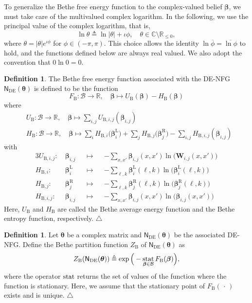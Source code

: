 \documentclass[conference]{IEEEtran}
\theoremstyle{plain}
\theoremstyle{definition}
\newtheorem{definition}[thm]{Definition}
\newcommand{\edefn}{\hfill$\triangle$}
\providecommand{\R}{\mathbb {R}}
\providecommand{\C}{\mathbb {C}}
\newcommand{\B}{\mathrm{B}}
\newcommand{\stat}{\operatornamewithlimits{stat}}
\newcommand{\sfn}{\mathsf{N}}
\newcommand{\bbeta}{\boldsymbol{\beta}}
\newcommand{\br}[1]{\bbeta^{\mathrm{R}}_{#1}}
\newcommand{\bl}[1]{\bbeta^{\mathrm{L}}_{#1}}
\newcommand{\be}[1]{\bbeta_{#1}}
\newcommand{\btheta}{\boldsymbol{\theta}}
\newcommand{\defeq}{\triangleq}
\newcommand{\sfnDE}{\sfn_{\mathrm{DE}}}
\begin{document}
 To generalize the Bethe free energy function to the complex-valued belief
 $\bbeta$, we must take care of the multivalued complex logarithm. In the
 following, we use the principal value of the complex logarithm, that is,
 \[
  \ln \theta \defeq\ln|\theta|+\iota\phi,\quad \theta\in\C\setminus\R_{\leq 0},
 \]
 where $\theta=|\theta|e^{\iota \phi}$ for $\phi\in(-\pi,\pi)$. This choice
 allows the identity $\ln\overline\phi=\overline{\ln\phi}$ to hold, and the
 functions defined below are always real valued. We also adopt the convention
 that $0\ln 0=0$.

 \begin{definition}
  The Bethe free energy function associated with the DE-NFG $\sfnDE(\btheta)$ is defined to be the function
  \[
   F_{\B}:\mathcal B\to\R,\quad \bbeta\mapsto  U_{\B}(\bbeta) - H_{\mathrm{B}}(\bbeta)
  \]
  where
  \begin{align*}
    & U_{\B} : \mathcal B\to \R,\quad \bbeta \mapsto \sum_{i,j} U_{\B,i,j}(\be{i,j})                                 \\
    & H_{\B}: \mathcal B \to \R,\quad \bbeta \mapsto \sum_iH_{\B,i}\big(\bl{i}\big)+\sum_{j}H_{\B,j}\big(\br{j}\big)
   -\sum_{i,j}H_{\B,i,j}(\be{i,j})
  \end{align*}
  with
  \begin{alignat*}{3}
   U_{\B,i,j}:\  & \be{i,j} &  & \mapsto &  & -\sum_{x,x'} \be{i,j}(x,x')\ln\big(\mathbf W_{i,j}(x,x')\big) \\
   H_{\B,i}:\    & \bl{i}   &  & \mapsto &  & -\sum_{\ell,k}\bl{i}(\ell,k)\ln\big(\bl{i}(\ell,k)\big)       \\
   H_{\B,j}:\    & \br{j}   &  & \mapsto &  & -\sum_{\ell,k}\br{j}(\ell,k)\ln\big(\br{j}(\ell,k)\big)       \\
   H_{\B,i,j}:\  & \be{i,j} &  & \mapsto &  & -\sum_{x,x'} \be{i,j}(x,x')\ln\big(\be{i,j}(x,x')\big)
  \end{alignat*}
  Here, $U_{\B}$ and $H_{\B}$ are called the Bethe average energy function and the Bethe entropy function, respectively.
  \edefn
 \end{definition}

 \begin{definition}
  Let $\btheta$ be a complex matrix and $\sfnDE(\btheta)$ be the associated DE-NFG. Define the Bethe partition function $Z_\B$ of $\sfnDE(\btheta)$ as
  \begin{align*}
   Z_\B (\sfnDE(\btheta)) \defeq \exp\Big(- \stat_{\bbeta \in \mathcal B} F_\B(\bbeta)\Big),
  \end{align*}
  where the operator $\stat$ returns the set of values of the function where the function is stationary.
  Here, we assume that the stationary point of \(F_\B(\,\cdot\,)\) exists and is unique.
  \edefn
 \end{definition}
\end{document}
